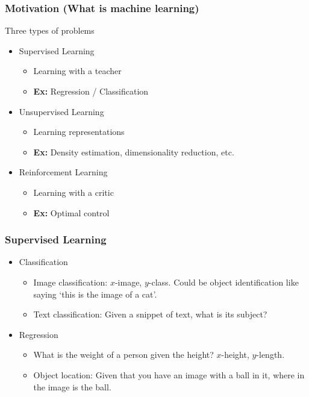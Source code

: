 \documentclass[10pt,handout]{beamer}
\begin{document}
\begin{frame}
	\frametitle{Motivation (What is machine learning)}
	Three types of problems
	\begin{itemize}
		\item Supervised Learning
		\begin{itemize}
			\item Learning with a teacher
			\item {\bf Ex: }Regression / Classification
		\end{itemize}
		\pause
		\item Unsupervised Learning
		\begin{itemize}
			\item Learning representations
			\item {\bf Ex: }Density estimation, dimensionality reduction, etc.
		\end{itemize}
		\item Reinforcement Learning
		\begin{itemize}
			\item Learning with a critic
			\item {\bf Ex: }Optimal control
		\end{itemize}
	\end{itemize}
\end{frame}
\begin{frame}
	\frametitle{Supervised Learning}
	\begin{itemize}
		\item Classification
		\begin{itemize}
			\item Image classification: $x$-image, $y$-class. Could be object identification like saying `this is the image of a cat'.
			\item Text classification: Given a snippet of text, what is its subject?
		\end{itemize}
		\pause
		\item Regression
		\begin{itemize}
			\item What is the weight of a person given the height? $x$-height, $y$-length.
			\item Object location: Given that you have an image with a ball in it, where in the image is the ball.
		\end{itemize}
	\end{itemize}
\end{frame}
\end{document}
